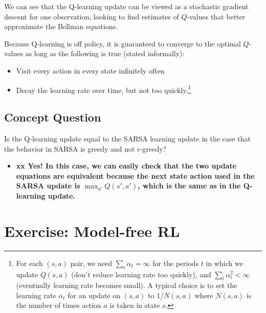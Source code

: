 \documentclass[12pt]{article}
\begin{document}
          We can see that the Q-learning update can be viewed as a
          stochastic gradient descent for one observation, looking to
          find estimates of $Q$-values that better approximate the
          Bellman equations.

           Because Q-learning is off policy, it is guaranteed to
           converge to the optimal $Q$-values as long as the following
           is true (stated informally):
           \begin{itemize}
           \item Visit every action in every state infinitely often
           \item Decay the learning rate over time, but not too
             quickly.\footnote{For each $(s,a)$ pair, we need
             $\sum_t \alpha_t=\infty$ for the periods $t$ in which we
             update $Q(s,a)$ (don't reduce learning rate too quickly),
             and $\sum_t\alpha_t^2<\infty$ (eventually learning rate
             becomes small). A typical choice is to set the  learning rate
    $\alpha_t$ for an update on $(s,a)$  to $1/N(s,a)$ where
    $N(s,a)$ is the number of times action $a$ is taken in state $s$.}
  \end{itemize}


  \subsection{Concept Question}

  Is the Q-learning update equal to the SARSA learning update in the
  case that the behavior in SARSA is greedy and not $\epsilon$-greedy?
%
  \begin{itemize}
  \item {\bf xx  Yes! In this case, we can easily check that the two
      update equations are equivalent because the next state action
      used  in the  SARSA update is $\max_{a'}Q(s',a')$, which is the same
      as in the Q-learning update.}
  \end{itemize}

\section{Exercise: Model-free RL}
\end{document}
